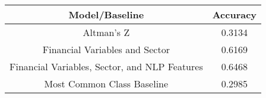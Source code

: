 \footnotesize
\begin{tabular}{cc}
\toprule
Model/Baseline & Accuracy \\
\midrule
Altman's Z & 0.3134 \\
Financial Variables and Sector & 0.6169 \\
Financial Variables, Sector, and NLP Features & 0.6468 \\
Most Common Class Baseline & 0.2985 \\
\bottomrule
\end{tabular}

\normalsize
